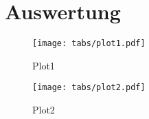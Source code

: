 \section{Auswertung}






\begin{figure}
  \centering
  \texttt{[image: tabs/plot1.pdf]}
  \caption{Plot1}
  \label{fig: Plot1}
\end{figure}

\begin{figure}
  \centering
  \texttt{[image: tabs/plot2.pdf]}
  \caption{Plot2}
  \label{fig: Plot2}
\end{figure}
